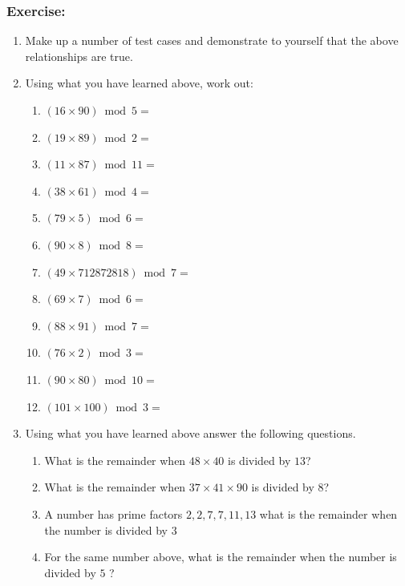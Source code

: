 \documentclass[a4paper,12pt]{article}
\begin{document}
\subsubsection{Exercise:}
\begin{enumerate}
\item Make up a number of test cases and demonstrate to yourself that the above relationships are true.
\item Using what you have learned above, work out:
\begin{multicols}{2}
\begin{enumerate}[label= \roman*)]
\item $(16 \times 90) \bmod 5 = $\\
\item $(19 \times 89)\bmod 2 = $\\
\item $(11 \times 87) \bmod 11 = $\\
\item $(38 \times 61) \bmod 4 = $\\
\item $(79 \times 5) \bmod 6 = $\\
\item $(90 \times 8) \bmod 8 = $\\
\item $(49 \times 712872818) \bmod 7 = $\\
\item $(69 \times 7) \bmod 6 = $\\
\item $(88 \times 91) \bmod 7 = $\\
\item $(76 \times 2) \bmod 3 = $\\
\item $(90 \times 80 ) \bmod 10 = $\\
\item $(101 \times 100) \bmod 3 = $\\
\end{enumerate}
\end{multicols}
\item Using what you have learned above answer the following questions.
\begin{enumerate}[label= \roman*)]
\item What is the remainder when $48 \times 40$ is divided by $13$?
\item What is the remainder when $37 \times 41 \times 90$ is divided by $8$?
\item A number has prime factors $2,2,7,7,11,13$ what is the remainder when the number is divided by $3$
\item For the same number above, what is the remainder when the number is divided by $5$ ?
\end{enumerate}
\end{enumerate}
\newpage
\end{document}
